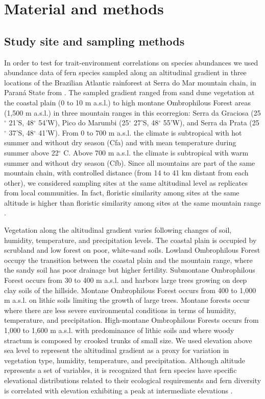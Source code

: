 \documentclass[12pt]{article}
\begin{document}
\section*{Material and methods}

\subsection*{Study site and sampling methods}
In order to test for trait-environment correlations on species abundances we 
used abundance data of fern species sampled along an
altitudinal gradient  in three  
locations of the Brazilian Atlantic rainforest at 
Serra
do Mar mountain chain, in Paran\'a State from \cite{Paciencia2008}.
The sampled gradient ranged from
sand dune vegetation at the coastal plain (0 to 10 m a.s.l.) to high montane 
Ombrophilous Forest areas (1,500 m a.s.l.) in three mountain ranges 
in this ecorregion: 
Serra da 
Graciosa (25{$^{\circ}$} 21'S, 48{$^{\circ}$} 54'W), Pico do Marumbi 
(25{$^{\circ}$} 27'S, 48{$^{\circ}$} 55'W), and Serra da Prata (25{$^{\circ}$} 
37'S, 48{$^{\circ}$} 41'W). From 0 to 700 m a.s.l. the climate is subtropical with hot summer and 
without dry season (Cfa) and with mean temperature 
during summer above 22{$^{\circ}$} C. Above 700 m a.s.l. the climate is 
subtropical with warm summer and without dry season (Cfb). Since all mountains 
are part of the same mountain chain, with controlled distance (from 14 to 41 km 
distant from each other), we considered sampling sites at the same
altitudinal level as replicates from local communities. 
In fact, floristic similarity among sites at the same altitude is higher than 
floristic similarity among sites at the same mountain range 
\citep{Paciencia2008}. 
 
Vegetation along the altitudinal gradient varies following changes of soil, 
humidity, temperature, and precipitation levels. 
The coastal plain is occupied by scrubland and low forest on poor, white-sand 
soils. 
Lowland Ombrophilous Forest occupy the transition between the coastal plain and 
the mountain range, where the sandy soil has poor drainage but higher fertility. 
Submontane Ombrophilous Forest occurs from 30 to 400 m a.s.l. and harbors large 
trees growing on deep clay soils of the hillside. Montane Ombrophilous Forest occurs 
from 400 to 1,000 m a.s.l. on lithic soils limiting the growth of large 
trees. Montane forests occur where there are less severe environmental 
conditions in terms of humidity, temperature, and precipitation. High-montane 
Ombrophilous Forests occurs from 1,000 to 1,600 m a.s.l. with predominance of 
lithic soils and where woody stractum is composed by crooked trunks of small 
size. 
We used elevation above sea level to represent the altitudinal gradient as a
proxy for variation in vegetation type, humidity, temperature, and
precipitation.  
Although altitude represents a set of variables, it is 
recognized that
fern species have specific elevational distributions related to their
ecological requirements \citep{Mehltreter2010} and fern diversity is correlated with elevation 
exhibiting a peak at intermediate elevations \citep{Kessler2001,Cardelus2006,WatkinsJr2006}. 
\end{document}
